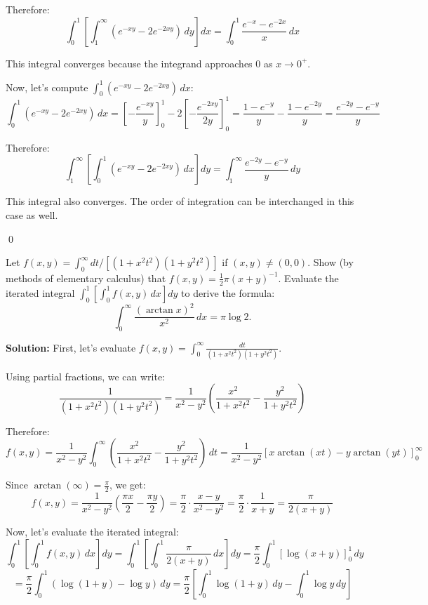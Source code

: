 \begin{enumerate}[label=(\alph*)]
    Therefore:
    \[\int_{0}^{1} \left[ \int_{1}^{\infty} (e^{-xy} - 2e^{-2xy}) \, dy \right] dx = \int_{0}^{1} \frac{e^{-x} - e^{-2x}}{x} \, dx\]
    
    This integral converges because the integrand approaches 0 as $x \to 0^+$.
    
    Now, let's compute $\int_{0}^{1} (e^{-xy} - 2e^{-2xy}) \, dx$:
    \[\int_{0}^{1} (e^{-xy} - 2e^{-2xy}) \, dx = \left[-\frac{e^{-xy}}{y}\right]_{0}^{1} - 2\left[-\frac{e^{-2xy}}{2y}\right]_{0}^{1} = \frac{1 - e^{-y}}{y} - \frac{1 - e^{-2y}}{y} = \frac{e^{-2y} - e^{-y}}{y}\]
    
    Therefore:
    \[\int_{1}^{\infty} \left[ \int_{0}^{1} (e^{-xy} - 2e^{-2xy}) \, dx \right] dy = \int_{1}^{\infty} \frac{e^{-2y} - e^{-y}}{y} \, dy\]
    
    This integral also converges. The order of integration can be interchanged in this case as well.
\end{enumerate}\qed


\begin{problembox}
Let $f(x, y) = \int_{0}^{\infty} dt / [(1 + x^{2}t^{2})(1 + y^{2}t^{2})]$ if $(x, y) \neq (0, 0)$. Show (by methods of elementary calculus) that $f(x, y) = \frac{1}{2}\pi(x + y)^{-1}$. Evaluate the iterated integral $\int_{0}^{1} \left[ \int_{0}^{1} f(x, y) \, dx \right] dy$ to derive the formula:
\[\int_{0}^{\infty} \frac{(\arctan x)^{2}}{x^{2}} \, dx = \pi \log 2.\]
\end{problembox}

\noindent\textbf{Solution:}
First, let's evaluate $f(x, y) = \int_{0}^{\infty} \frac{dt}{(1 + x^{2}t^{2})(1 + y^{2}t^{2})}$.

Using partial fractions, we can write:
\[\frac{1}{(1 + x^{2}t^{2})(1 + y^{2}t^{2})} = \frac{1}{x^{2} - y^{2}} \left(\frac{x^{2}}{1 + x^{2}t^{2}} - \frac{y^{2}}{1 + y^{2}t^{2}}\right)\]

Therefore:
\[f(x, y) = \frac{1}{x^{2} - y^{2}} \int_{0}^{\infty} \left(\frac{x^{2}}{1 + x^{2}t^{2}} - \frac{y^{2}}{1 + y^{2}t^{2}}\right) \, dt = \frac{1}{x^{2} - y^{2}} \left[x \arctan(xt) - y \arctan(yt)\right]_{0}^{\infty}\]

Since $\arctan(\infty) = \frac{\pi}{2}$, we get:
\[f(x, y) = \frac{1}{x^{2} - y^{2}} \left(\frac{\pi x}{2} - \frac{\pi y}{2}\right) = \frac{\pi}{2} \cdot \frac{x - y}{x^{2} - y^{2}} = \frac{\pi}{2} \cdot \frac{1}{x + y} = \frac{\pi}{2(x + y)}\]

Now, let's evaluate the iterated integral:
\[\int_{0}^{1} \left[ \int_{0}^{1} f(x, y) \, dx \right] dy = \int_{0}^{1} \left[ \int_{0}^{1} \frac{\pi}{2(x + y)} \, dx \right] dy = \frac{\pi}{2} \int_{0}^{1} \left[ \log(x + y) \right]_{0}^{1} \, dy\]
\[= \frac{\pi}{2} \int_{0}^{1} (\log(1 + y) - \log y) \, dy = \frac{\pi}{2} \left[ \int_{0}^{1} \log(1 + y) \, dy - \int_{0}^{1} \log y \, dy \right]\]

